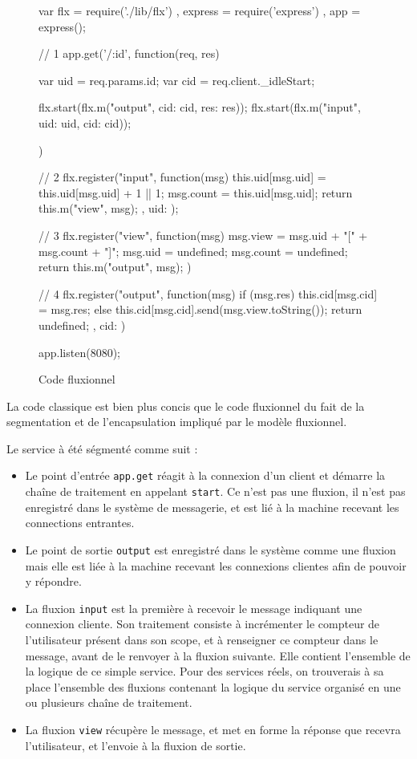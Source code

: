 \begin{figure}
  \begin{code}
  var flx = require('./lib/flx')
    , express = require('express')
    , app = express();

  // 1
  app.get('/:id', function(req, res) {
    var uid = req.params.id;
    var cid = req.client._idleStart;

    flx.start(flx.m("output", {cid: cid, res: res}));
    flx.start(flx.m("input", {uid: uid, cid: cid}));
  })

  // 2
  flx.register("input", function(msg){
    this.uid[msg.uid] = this.uid[msg.uid] + 1 || 1;
    msg.count = this.uid[msg.uid];
    return this.m("view", msg);
  },{
    uid: {}
  });

  // 3
  flx.register("view", function(msg) {
    msg.view = msg.uid + "[" + msg.count + "]";
    msg.uid = undefined;
    msg.count = undefined;
    return this.m("output", msg);
  })

  // 4
  flx.register("output", function(msg){
    if (msg.res) {
      this.cid[msg.cid] = msg.res;
    } else {
      this.cid[msg.cid].send(msg.view.toString());
    }
    return undefined;
  }, {
    cid: {}
  })

  app.listen(8080);
  \end{code}
  \caption{Code fluxionnel}
  \label{lst:fluxionnel}
\end{figure}

La code classique est bien plus concis que le code fluxionnel du fait de la segmentation et de l'encapsulation impliqué par le modèle fluxionnel.

Le service à été ségmenté comme suit :
\begin{itemize}
  \item[\circled{1}] Le point d'entrée \texttt{app.get} réagit à la connexion d'un client et démarre la chaîne de traitement en appelant \texttt{start}.
  Ce n'est pas une fluxion, il n'est pas enregistré dans le système de messagerie, et est lié à la machine recevant les connections entrantes.
  \item[\circled{4}] Le point de sortie \texttt{output} est enregistré dans le système comme une fluxion mais elle est liée à la machine recevant les connexions clientes afin de pouvoir y répondre.
  \item[\circled{2}] La fluxion \texttt{input} est la première à recevoir le message indiquant une connexion cliente. Son traitement consiste à incrémenter le compteur de l'utilisateur présent dans son scope, et à renseigner ce compteur dans le message, avant de le renvoyer à la fluxion suivante.
  Elle contient l'ensemble de la logique de ce simple service. Pour des services réels, on trouverais à sa place l'ensemble des fluxions contenant la logique du service organisé en une ou plusieurs chaîne de traitement.
  \item[\circled{3}] La fluxion \texttt{view} récupère le message, et met en forme la réponse que recevra l'utilisateur, et l'envoie à la fluxion de sortie.
\end{itemize}

